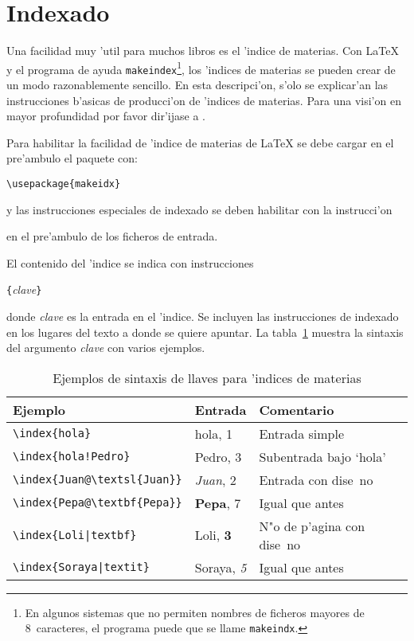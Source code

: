 \section{Indexado} \label{sec:indexing}
Una facilidad muy 'util para muchos libros es el 'indice de
materias. Con \LaTeX{} y
el programa de ayuda \texttt{makeindex}\footnote{En algunos sistemas
  que no permiten nombres de ficheros mayores de 8~caracteres, el
  programa puede que se llame \texttt{makeindx}.}, los 'indices de
materias se pueden crear de un modo razonablemente sencillo. En esta
descripci'on, s'olo se explicar'an las instrucciones b'asicas de
producci'on de 'indices de materias. Para una visi'on en mayor
profundidad por favor dir'ijase a \companion.%
%

Para habilitar la facilidad de 'indice de materias de \LaTeX{} se
debe cargar en el pre'ambulo el paquete  con:
\begin{command}
\verb|\usepackage{makeidx}|
\end{command}
\noindent y las instrucciones especiales de indexado se deben
habilitar con la instrucci'on
\begin{command}
\end{command}
\noindent en el pre'ambulo de los ficheros de entrada.

El contenido del 'indice se indica con instrucciones
\begin{command}
  \verb|{|\emph{clave}\verb|}|
\end{command}
\noindent donde \emph{clave} es la entrada en el 'indice. Se incluyen
las instrucciones de indexado en los lugares del texto a donde se
quiere apuntar. La tabla~\ref{index} muestra la sintaxis del argumento
\emph{clave} con varios ejemplos.

\begin{table}[!bp]
\caption{Ejemplos de sintaxis de llaves para 'indices de materias}
\label{index}
\begin{center}
\begin{tabular}{@{}lll@{}}
  \textbf{Ejemplo} &\textbf{Entrada} &\textbf{Comentario}\\\hline
  \rule{0pt}{1.05em}\verb|\index{hola}| &hola, 1 &Entrada simple\\ 
  \verb|\index{hola!Pedro}| &\hspace*{2ex}Pedro, 3 &Subentrada bajo
  `hola'\\
  \verb|\index{Juan@\textsl{Juan}}| &\textsl{Juan}, 2& Entrada con
  dise~no\\
  \verb|\index{Pepa@\textbf{Pepa}}| &\textbf{Pepa}, 7& Igual que antes\\
  \verb.\index{Loli|textbf}.  &Loli, \textbf{3}& N"o de p'agina
  con dise~no\\ 
  \verb.\index{Soraya|textit}.  &Soraya, \textit{5}& Igual que antes
\end{tabular}
\end{center}
\end{table}

